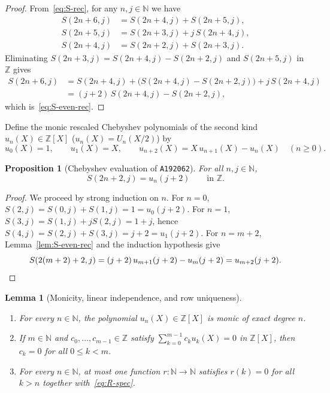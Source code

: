 \documentclass[11pt]{article}
\newtheorem{proposition}[theorem]{Proposition}
\newtheorem{lemma}[theorem]{Lemma}
\theoremstyle{definition}
\newcommand{\N}{\mathbb{N}}
\newcommand{\Z}{\mathbb{Z}}
\newcommand{\seq}[1]{\texttt{#1}}
\begin{document}
\begin{proof}
From~\eqref{eq:S-rec}, for any $n, j \in \N$ we have
\begin{align*}
S(2n+6, j) &= S(2n+4, j) + S(2n+5, j), \\
S(2n+5, j) &= S(2n+3, j) + j\,S(2n+4, j), \\
S(2n+4, j) &= S(2n+2, j) + S(2n+3, j).
\end{align*}
Eliminating $S(2n+3, j) = S(2n+4, j) - S(2n+2, j)$ and $S(2n+5, j)$ in $\Z$ gives
\begin{align*}
S(2n+6, j) &= S(2n+4, j) + \bigl(S(2n+4, j) - S(2n+2, j)\bigr) + j\,S(2n+4, j) \\
           &= (j+2)\,S(2n+4, j) - S(2n+2, j),
\end{align*}
which is~\eqref{eq:S-even-rec}.
\end{proof}

Define the monic rescaled Chebyshev polynomials of the second kind $u_n(X) \in \Z[X]$ ($u_n(X) = U_n(X/2)$) by
\begin{equation}
\label{eq:uPoly}
u_0(X) = 1, \qquad u_1(X) = X, \qquad u_{n+2}(X) = X\,u_{n+1}(X) - u_n(X) \quad (n \ge 0).
\end{equation}

\begin{proposition}[Chebyshev evaluation of \seq{A192062}]
\label{prop:S-eq-uPoly}
For all $n, j \in \N$,
\[
S(2n + 2, j) = u_n(j + 2) \qquad \text{in } \Z.
\]
\end{proposition}

\begin{proof}
We proceed by strong induction on $n$. For $n = 0$, $S(2, j) = S(0, j) + S(1, j) = 1 = u_0(j + 2)$. For $n = 1$, $S(3, j) = S(1, j) + j S(2, j) = 1 + j$, hence $S(4, j) = S(2, j) + S(3, j) = j + 2 = u_1(j + 2)$. For $n = m + 2$, Lemma~\ref{lem:S-even-rec} and the induction hypothesis give
\[
S(2(m+2)+2, j) = (j + 2)\,u_{m+1}(j + 2) - u_m(j + 2) = u_{m+2}(j + 2). \qedhere
\]
\end{proof}

\begin{lemma}[Monicity, linear independence, and row uniqueness]
\label{lem:uniqueness}
\begin{enumerate}
\item[\textup{(a)}] For every $n \in \N$, the polynomial $u_n(X) \in \Z[X]$ is monic of exact degree $n$.
\item[\textup{(b)}] If $m \in \N$ and $c_0, \dots, c_{m-1} \in \Z$ satisfy $\sum_{k=0}^{m-1} c_k u_k(X) = 0$ in $\Z[X]$, then $c_k = 0$ for all $0 \le k < m$.
\item[\textup{(c)}] For every $n \in \N$, at most one function $r : \N \to \N$ satisfies $r(k) = 0$ for all $k > n$ together with~\eqref{eq:R-spec}.
\end{enumerate}
\end{lemma}
\end{document}
